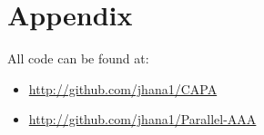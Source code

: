 \section{Appendix}
All code can be found at:
\begin{itemize}
    \item\url{http://github.com/jhana1/CAPA}
    \item\url{http://github.com/jhana1/Parallel-AAA}
\end{itemize}



